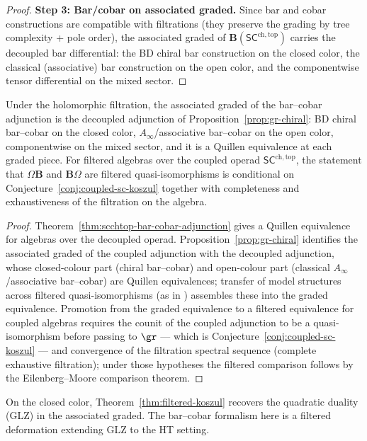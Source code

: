 \begin{proof}
\textbf{Step 3: Bar/cobar on associated graded.}
Since bar and cobar constructions are compatible with filtrations (they preserve the grading by tree complexity + pole order), the associated graded of $\mathbf{B}(\mathsf{SC}^{\mathrm{ch,top}})$ carries the decoupled bar differential: the BD chiral bar construction on the closed color, the classical (associative) bar construction on the open color, and the componentwise tensor differential on the mixed sector.
\end{proof}

\begin{theorem}
\label{thm:filtered-koszul}
Under the holomorphic filtration, the associated graded of the
bar--cobar adjunction is the decoupled adjunction of
Proposition~\ref{prop:gr-chiral}: BD chiral bar--cobar on the
closed color, $A_\infty$/associative bar--cobar on the open color,
componentwise on the mixed sector, and it is a Quillen equivalence
at each graded piece. For filtered algebras over the coupled
operad $\mathsf{SC}^{\mathrm{ch,top}}$, the statement that
$\Omega\mathbf B$ and $\mathbf B\Omega$ are filtered
quasi-isomorphisms is conditional on
Conjecture~\ref{conj:coupled-sc-koszul} together with completeness
and exhaustiveness of the filtration on the algebra.
\end{theorem}

\begin{proof}
Theorem~\ref{thm:scchtop-bar-cobar-adjunction} gives a Quillen
equivalence for algebras over the decoupled operad.
Proposition~\ref{prop:gr-chiral} identifies the associated graded
of the coupled adjunction with the decoupled adjunction, whose
closed-colour part (chiral bar--cobar) and open-colour part
(classical $A_\infty$/associative bar--cobar) are Quillen
equivalences; transfer of model structures across filtered
quasi-isomorphisms (as in \cite[Theorem~2.1]{Val07}) assembles
these into the graded equivalence. Promotion from the graded
equivalence to a filtered equivalence for coupled algebras
requires the counit of the coupled adjunction to be a
quasi-isomorphism before passing to $\gr$ --- which is
Conjecture~\ref{conj:coupled-sc-koszul} --- and convergence of the
filtration spectral sequence (complete exhaustive filtration);
under those hypotheses the filtered comparison follows by the
Eilenberg--Moore comparison theorem.
\end{proof}

\begin{remark}
\label{rmk:GLZ}
On the closed color, Theorem~\ref{thm:filtered-koszul} recovers the
quadratic duality (GLZ) \cite{GLZ22} in the associated graded. The
bar--cobar formalism here is a filtered deformation extending GLZ to
the HT setting.
\end{remark}


